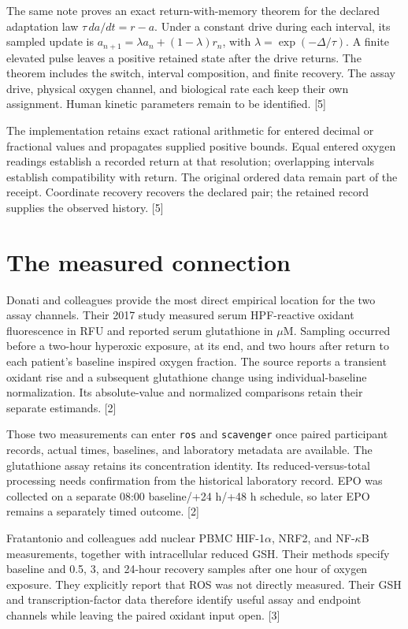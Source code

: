 \documentclass[11pt]{article}
\begin{document}
The same note proves an exact return-with-memory theorem for the
declared adaptation law \(\tau\,da/dt=r-a\). Under a constant drive
during each interval, its sampled update is
\(a_{n+1}=\lambda a_n+(1-\lambda)r_n\), with
\(\lambda=\exp(-\Delta/\tau)\). A finite elevated pulse leaves a
positive retained state after the drive returns. The theorem includes
the switch, interval composition, and finite recovery. The assay drive,
physical oxygen channel, and biological rate each keep their own
assignment. Human kinetic parameters remain to be identified. {[}5{]}

The implementation retains exact rational arithmetic for entered decimal
or fractional values and propagates supplied positive bounds. Equal
entered oxygen readings establish a recorded return at that resolution;
overlapping intervals establish compatibility with return. The original
ordered data remain part of the receipt. Coordinate recovery recovers
the declared pair; the retained record supplies the observed history.
{[}5{]}

\section*{The measured connection}\label{the-measured-connection}

Donati and colleagues provide the most direct empirical location for the
two assay channels. Their 2017 study measured serum HPF-reactive oxidant
fluorescence in RFU and reported serum glutathione in \(\mu\mathrm M\).
Sampling occurred before a two-hour hyperoxic exposure, at its end, and
two hours after return to each patient's baseline inspired oxygen
fraction. The source reports a transient oxidant rise and a subsequent
glutathione change using individual-baseline normalization. Its
absolute-value and normalized comparisons retain their separate
estimands. {[}2{]}

Those two measurements can enter \texttt{ros} and \texttt{scavenger}
once paired participant records, actual times, baselines, and laboratory
metadata are available. The glutathione assay retains its concentration
identity. Its reduced-versus-total processing needs confirmation from
the historical laboratory record. EPO was collected on a separate 08:00
baseline/+24 h/+48 h schedule, so later EPO remains a separately timed
outcome. {[}2{]}

Fratantonio and colleagues add nuclear PBMC HIF-1\(\alpha\), NRF2, and
NF-\(\kappa\)B measurements, together with intracellular reduced GSH.
Their methods specify baseline and 0.5, 3, and 24-hour recovery samples
after one hour of oxygen exposure. They explicitly report that ROS was
not directly measured. Their GSH and transcription-factor data therefore
identify useful assay and endpoint channels while leaving the paired
oxidant input open. {[}3{]}
\end{document}
